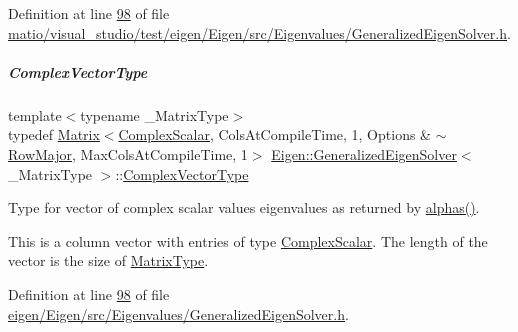 Definition at line \hyperlink{matio_2visual__studio_2test_2eigen_2_eigen_2src_2_eigenvalues_2_generalized_eigen_solver_8h_source_l00098}{98} of file \hyperlink{matio_2visual__studio_2test_2eigen_2_eigen_2src_2_eigenvalues_2_generalized_eigen_solver_8h_source}{matio/visual\+\_\+studio/test/eigen/\+Eigen/src/\+Eigenvalues/\+Generalized\+Eigen\+Solver.\+h}.

\mbox{\label{group___eigenvalues___module_acfd144329aca76882069da2fc5d53ef5}} 
\subparagraph{\texorpdfstring{Complex\+Vector\+Type}{ComplexVectorType}\hspace{0.1cm}{\footnotesize\ttfamily [2/2]}}
{\footnotesize\ttfamily template$<$typename \+\_\+\+Matrix\+Type$>$ \\
typedef \hyperlink{group___core___module_class_eigen_1_1_matrix}{Matrix}$<$\hyperlink{group___eigenvalues___module_abdec07af91db1345bb4c74066e3d0ea7}{Complex\+Scalar}, Cols\+At\+Compile\+Time, 1, Options \& $\sim$\hyperlink{group__enums_ggaacded1a18ae58b0f554751f6cdf9eb13acfcde9cd8677c5f7caf6bd603666aae3}{Row\+Major}, Max\+Cols\+At\+Compile\+Time, 1$>$ \hyperlink{group___eigenvalues___module_class_eigen_1_1_generalized_eigen_solver}{Eigen\+::\+Generalized\+Eigen\+Solver}$<$ \+\_\+\+Matrix\+Type $>$\+::\hyperlink{group___eigenvalues___module_acfd144329aca76882069da2fc5d53ef5}{Complex\+Vector\+Type}}



Type for vector of complex scalar values eigenvalues as returned by \hyperlink{group___eigenvalues___module_a82b1bc41267f46e5c5899d5b084a73bb}{alphas()}. 

This is a column vector with entries of type \hyperlink{group___eigenvalues___module_abdec07af91db1345bb4c74066e3d0ea7}{Complex\+Scalar}. The length of the vector is the size of \hyperlink{group___eigenvalues___module_a56f4b9823bb9a267de3aaf48428cd247}{Matrix\+Type}. 

Definition at line \hyperlink{eigen_2_eigen_2src_2_eigenvalues_2_generalized_eigen_solver_8h_source_l00098}{98} of file \hyperlink{eigen_2_eigen_2src_2_eigenvalues_2_generalized_eigen_solver_8h_source}{eigen/\+Eigen/src/\+Eigenvalues/\+Generalized\+Eigen\+Solver.\+h}.

